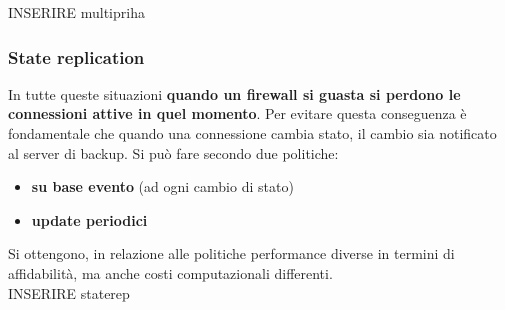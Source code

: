 \documentclass[12pt]{article}
\begin{document}
				INSERIRE multipriha\\
				
			\subsubsection{State replication}
				In tutte queste situazioni \textbf{quando un firewall si guasta si perdono le connessioni attive in quel momento}. Per evitare questa conseguenza è fondamentale che quando una connessione cambia stato, il cambio sia notificato al server di backup. Si può fare secondo due politiche:
				\begin{itemize}
					\item \textbf{su base evento} (ad ogni cambio di stato)
					\item \textbf{update periodici}
				\end{itemize}
				Si ottengono, in relazione alle politiche performance diverse in termini di affidabilità, ma anche costi computazionali differenti.\\
				
				INSERIRE staterep\\
				
\end{document}

